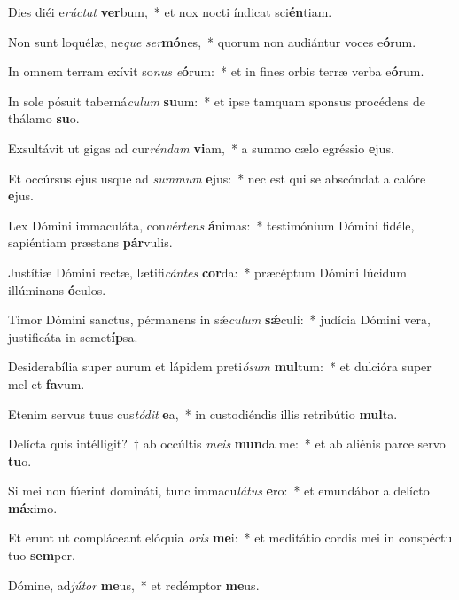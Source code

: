\item Dies diéi e\textit{rúc}\textit{tat} \textbf{ver}bum,~* et nox nocti índicat sci\textbf{én}tiam.
\item Non sunt loquélæ, ne\textit{que} \textit{ser}\textbf{mó}nes,~* quorum non audiántur voces e\textbf{ó}rum.
\item In omnem terram exívit so\textit{nus} \textit{e}\textbf{ó}rum:~* et in fines orbis terræ verba e\textbf{ó}rum.
\item In sole pósuit taberná\textit{cu}\textit{lum} \textbf{su}um:~* et ipse tamquam sponsus procédens de thálamo \textbf{su}o.
\item Exsultávit ut gigas ad cur\textit{rén}\textit{dam} \textbf{vi}am,~* a summo cælo egréssio \textbf{e}jus.
\item Et occúrsus ejus usque ad \textit{sum}\textit{mum} \textbf{e}jus:~* nec est qui se abscóndat a calóre \textbf{e}jus.
\item Lex Dómini immaculáta, con\textit{vér}\textit{tens} \textbf{á}nimas:~* testimónium Dómini fidéle, sapiéntiam præstans \textbf{pár}vulis.
\item Justítiæ Dómini rectæ, lætifi\textit{cán}\textit{tes} \textbf{cor}da:~* præcéptum Dómini lúcidum illúminans \textbf{ó}culos.
\item Timor Dómini sanctus, pérmanens in sǽ\textit{cu}\textit{lum} \textbf{sǽ}culi:~* judícia Dómini vera, justificáta in semet\textbf{íp}sa.
\item Desiderabília super aurum et lápidem preti\textit{ó}\textit{sum} \textbf{mul}tum:~* et dulcióra super mel et \textbf{fa}vum.
\item Etenim servus tuus cus\textit{tó}\textit{dit} \textbf{e}a,~* in custodiéndis illis retribútio \textbf{mul}ta.
\item Delícta quis intélligit?~† ab occúltis \textit{me}\textit{is} \textbf{mun}da me:~* et ab aliénis parce servo \textbf{tu}o.
\item Si mei non fúerint domináti, tunc immacu\textit{lá}\textit{tus} \textbf{e}ro:~* et emundábor a delícto \textbf{má}ximo.
\item Et erunt ut compláceant elóquia \textit{o}\textit{ris} \textbf{me}i:~* et meditátio cordis mei in conspéctu tuo \textbf{sem}per.
\item Dómine, ad\textit{jú}\textit{tor} \textbf{me}us,~* et redémptor \textbf{me}us.
